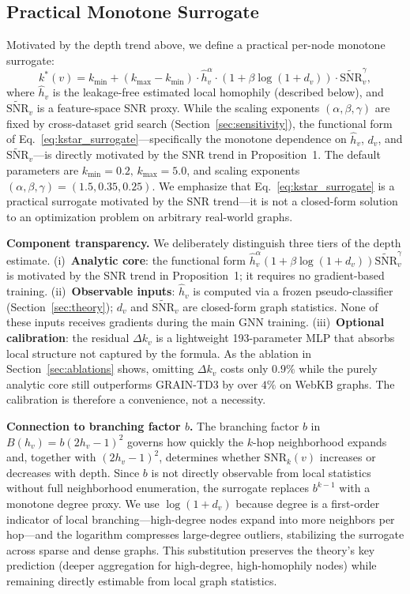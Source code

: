 \documentclass[letterpaper]{article}
\newcommand{\snrv}{\widetilde{\mathrm{SNR}}_v}
\begin{document}
\subsection{Practical Monotone Surrogate}
Motivated by the depth trend above, we define a practical per-node monotone surrogate:
\begin{equation}
  \label{eq:kstar_surrogate}
  k^*(v) = k_{\min} + (k_{\max} - k_{\min}) \cdot \hat{h}_v^{\alpha} \cdot (1 + \beta \log(1 + d_v)) \cdot \snrv^{\gamma},
\end{equation}
where $\hat{h}_v$ is the leakage-free estimated local homophily (described below), and $\snrv$ is a feature-space SNR proxy. While the scaling exponents $(\alpha, \beta, \gamma)$ are fixed by cross-dataset grid search (Section~\ref{sec:sensitivity}), the functional form of Eq.~\eqref{eq:kstar_surrogate}---specifically the monotone dependence on $\hat{h}_v$, $d_v$, and $\snrv$---is directly motivated by the SNR trend in Proposition~1. The default parameters are $k_{\min}=0.2,\, k_{\max}=5.0$, and scaling exponents $(\alpha, \beta, \gamma) = (1.5, 0.35, 0.25)$. We emphasize that Eq.~\eqref{eq:kstar_surrogate} is a practical surrogate motivated by the SNR trend---it is not a closed-form solution to an optimization problem on arbitrary real-world graphs.

\noindent\textbf{Component transparency.}\;
We deliberately distinguish three tiers of the depth estimate. (i)~\textbf{Analytic core}: the functional form $\hat{h}_v^{\alpha}(1+\beta\log(1+d_v))\snrv^{\gamma}$ is motivated by the SNR trend in Proposition~1; it requires no gradient-based training. (ii)~\textbf{Observable inputs}: $\hat{h}_v$ is computed via a frozen pseudo-classifier (Section~\ref{sec:theory}); $d_v$ and $\snrv$ are closed-form graph statistics. None of these inputs receives gradients during the main GNN training. (iii)~\textbf{Optional calibration}: the residual $\Delta k_v$ is a lightweight 193-parameter MLP that absorbs local structure not captured by the formula. As the ablation in Section~\ref{sec:ablations} shows, omitting $\Delta k_v$ costs only $0.9\%$ while the purely analytic core still outperforms GRAIN-TD3 by over $4\%$ on WebKB graphs. The calibration is therefore a convenience, not a necessity.

\noindent\textbf{Connection to branching factor $b$.}\;
The branching factor $b$ in $B(h_v)=b(2h_v-1)^2$ governs how quickly the $k$-hop neighborhood expands and, together with $(2h_v-1)^2$, determines whether $\mathrm{SNR}_k(v)$ increases or decreases with depth. Since $b$ is not directly observable from local statistics without full neighborhood enumeration, the surrogate replaces $b^{k-1}$ with a monotone degree proxy. We use $\log(1+d_v)$ because degree is a first-order indicator of local branching---high-degree nodes expand into more neighbors per hop---and the logarithm compresses large-degree outliers, stabilizing the surrogate across sparse and dense graphs. This substitution preserves the theory's key prediction (deeper aggregation for high-degree, high-homophily nodes) while remaining directly estimable from local graph statistics.
\end{document}
